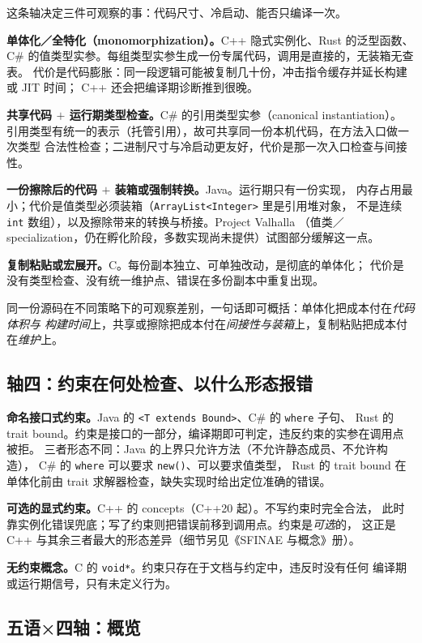 \documentclass[12pt,a4paper,fontset=fandol]{ctexbook}
\newcommand{\cpp}[1]{C++#1}
\newcommand{\kw}[1]{\texttt{#1}}
\begin{document}
这条轴决定三件可观察的事：代码尺寸、冷启动、能否只编译一次。

\textbf{单体化／全特化（monomorphization）。}\cpp{} 隐式实例化、Rust 的泛型函数、
C\# 的值类型实参。每组类型实参生成一份专属代码，调用是直接的，无装箱无查表。
代价是代码膨胀：同一段逻辑可能被复制几十份，冲击指令缓存并延长构建或 JIT 时间；
\cpp{} 还会把编译期诊断推到很晚。

\textbf{共享代码 $+$ 运行期类型检查。}C\# 的引用类型实参（canonical instantiation）。
引用类型有统一的表示（托管引用），故可共享同一份本机代码，在方法入口做一次类型
合法性检查；二进制尺寸与冷启动更友好，代价是那一次入口检查与间接性。

\textbf{一份擦除后的代码 $+$ 装箱或强制转换。}Java。运行期只有一份实现，
内存占用最小；代价是值类型必须装箱（\kw{ArrayList<Integer>} 里是引用堆对象，
不是连续 \kw{int} 数组），以及擦除带来的转换与桥接。Project Valhalla
（值类／specialization，仍在孵化阶段，多数实现尚未提供）试图部分缓解这一点。

\textbf{复制粘贴或宏展开。}C。每份副本独立、可单独改动，是彻底的单体化；
代价是没有类型检查、没有统一维护点、错误在多份副本中重复出现。

同一份源码在不同策略下的可观察差别，一句话即可概括：单体化把成本付在\emph{代码体积与
构建时间}上，共享或擦除把成本付在\emph{间接性与装箱}上，复制粘贴把成本付在\emph{维护}上。

\subsection{轴四：约束在何处检查、以什么形态报错}

\textbf{命名接口式约束。}Java 的 \kw{<T extends Bound>}、C\# 的 \kw{where} 子句、
Rust 的 trait bound。约束是接口的一部分，编译期即可判定，违反约束的实参在调用点被拒。
三者形态不同：Java 的上界只允许方法（不允许静态成员、不允许构造），
C\# 的 \kw{where} 可以要求 \kw{new()}、可以要求值类型，
Rust 的 trait bound 在单体化前由 trait 求解器检查，缺失实现时给出定位准确的错误。

\textbf{可选的显式约束。}\cpp{} 的 concepts（\cpp{20} 起）。不写约束时完全合法，
此时靠实例化错误兜底；写了约束则把错误前移到调用点。约束是\emph{可选}的，
这正是 \cpp{} 与其余三者最大的形态差异（细节另见《SFINAE 与概念》册）。

\textbf{无约束概念。}C 的 \kw{void*}。约束只存在于文档与约定中，违反时没有任何
编译期或运行期信号，只有未定义行为。

\subsection{五语×四轴：概览}
\end{document}
